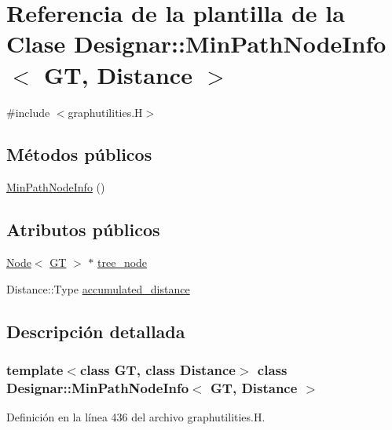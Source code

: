 \hypertarget{class_designar_1_1_min_path_node_info}{}\section{Referencia de la plantilla de la Clase Designar\+:\+:Min\+Path\+Node\+Info$<$ GT, Distance $>$}
\label{class_designar_1_1_min_path_node_info}


{\ttfamily \#include $<$graphutilities.\+H$>$}

\subsection*{Métodos públicos}
\begin{DoxyCompactItemize}
\item 
\hyperlink{class_designar_1_1_min_path_node_info_a50c93fccfecfd75d3aa7637be108ef4d}{Min\+Path\+Node\+Info} ()
\end{DoxyCompactItemize}
\subsection*{Atributos públicos}
\begin{DoxyCompactItemize}
\item 
\hyperlink{namespace_designar_a5af326c65aa2bd26b26c410f2030d09e}{Node}$<$ \hyperlink{demo-buildgraph_8_c_a3001c40d2c31ca87ed96cd7d1334a55e}{GT} $>$ $\ast$ \hyperlink{class_designar_1_1_min_path_node_info_a0121695ed8523a60ee92375767a5c169}{tree\+\_\+node}
\item 
Distance\+::\+Type \hyperlink{class_designar_1_1_min_path_node_info_acd8b2664b0726bf26b0f66213e4f1e4b}{accumulated\+\_\+distance}
\end{DoxyCompactItemize}


\subsection{Descripción detallada}
\subsubsection*{template$<$class GT, class Distance$>$\newline
class Designar\+::\+Min\+Path\+Node\+Info$<$ G\+T, Distance $>$}



Definición en la línea 436 del archivo graphutilities.\+H.



